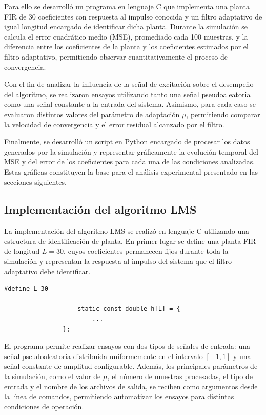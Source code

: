 \documentclass[12pt]{article}
\begin{document}
			Para ello se desarrolló un programa en lenguaje C que implementa una planta FIR de 30 coeficientes con respuesta al impulso conocida y un filtro adaptativo de igual longitud encargado de identificar dicha planta. Durante la simulación se calcula el error cuadrático medio (MSE), promediado cada 100 muestras, y la diferencia entre los coeficientes de la planta y los coeficientes estimados por el filtro adaptativo, permitiendo observar cuantitativamente el proceso de convergencia.

			Con el fin de analizar la influencia de la señal de excitación sobre el desempeño del algoritmo, se realizaron ensayos utilizando tanto una señal pseudoaleatoria como una señal constante a la entrada del sistema. Asimismo, para cada caso se evaluaron distintos valores del parámetro de adaptación $\mu$, permitiendo comparar la velocidad de convergencia y el error residual alcanzado por el filtro.

			Finalmente, se desarrolló un script en Python encargado de procesar los datos generados por la simulación y representar gráficamente la evolución temporal del MSE y del error de los coeficientes para cada una de las condiciones analizadas. Estas gráficas constituyen la base para el análisis experimental presentado en las secciones siguientes.
	
		\subsection{Implementación del algoritmo LMS}

			La implementación del algoritmo LMS se realizó en lenguaje C utilizando una estructura de identificación de planta. En primer lugar se define una planta FIR de longitud $L=30$, cuyos coeficientes permanecen fijos durante toda la simulación y representan la respuesta al impulso del sistema que el filtro adaptativo debe identificar.

				\begin{lstlisting}[style=mystyle]
					#define L 30

					static const double h[L] = {
						...
				};
				\end{lstlisting}

				El programa permite realizar ensayos con dos tipos de señales de entrada: una señal pseudoaleatoria distribuida uniformemente en el intervalo $[-1,1]$ y una señal constante de amplitud configurable. Además, los principales parámetros de la simulación, como el valor de $\mu$, el número de muestras procesadas, el tipo de entrada y el nombre de los archivos de salida, se reciben como argumentos desde la línea de comandos, permitiendo automatizar los ensayos para distintas condiciones de operación.
\end{document}
